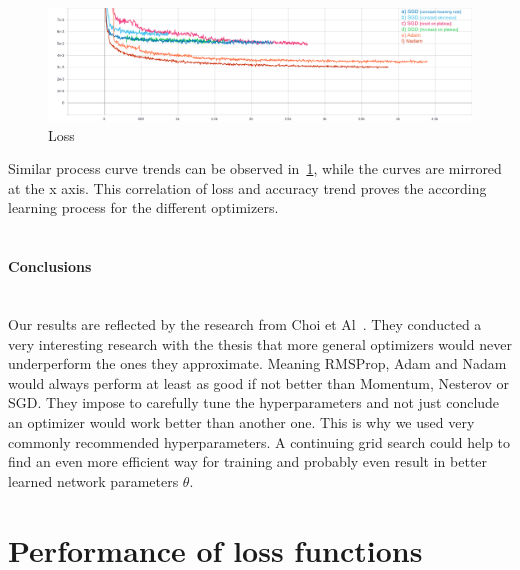 \begin{figure}[H]
    \centering
    \includegraphics[width=\textwidth,height=\textheight,keepaspectratio]{img/loss_all.png}
    \decoRule
    \caption[loss]{Loss}
    \label{fig:loss}
\end{figure}
Similar process curve trends can be observed in~\ref{fig:loss}, while the curves are mirrored at the x axis.
This correlation of loss and accuracy trend proves the according learning process for the different optimizers.
\\\mbox{}\\
\paragraph{Conclusions}\mbox{}\\
Our results are reflected by the research from Choi et Al~\cite{empiricaloptimizers}.
They conducted a very interesting research with the thesis that more general optimizers would never underperform
the ones they approximate.
Meaning RMSProp, Adam and Nadam would always perform at least as good if not better than Momentum, Nesterov or SGD.
They impose to carefully tune the hyperparameters and not just conclude an optimizer would work better than another one.
This is why we used very commonly recommended hyperparameters.
A continuing grid search could help to find an even more efficient way for training and probably even result in better
learned network parameters $\theta$.





\section{Performance of loss functions}

